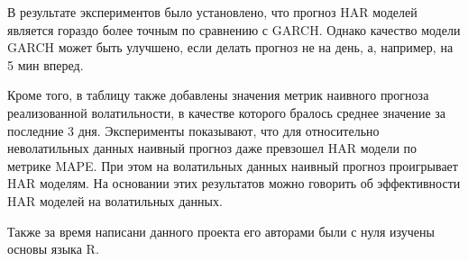 \documentclass[]{article}
\begin{document}
В результате экспериментов было установлено, что прогноз HAR моделей является гораздо более точным по сравнению с GARCH. Однако качество модели GARCH может быть улучшено, если делать прогноз не на день, а, например, на 5 мин вперед.

Кроме того, в таблицу также добавлены значения метрик наивного прогноза реализованной волатильности, в качестве которого бралось среднее значение за последние 3 дня. Эксперименты показывают, что для относительно неволатильных данных наивный прогноз даже превзошел HAR модели по метрике MAPE. При этом на волатильных данных наивный прогноз проигрывает HAR моделям. На основании этих результатов можно говорить об эффективности HAR моделей на волатильных данных.

Также за время написани данного проекта его авторами были с нуля изучены основы языка R.
\end{document}
